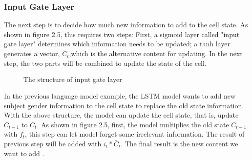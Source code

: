 \subsubsection{Input Gate Layer}
The next step is to decide how much new information to add to the cell state. As shown in figure 2.5, this requires two steps: First, a sigmoid layer called "input gate layer" determines which information needs to be updated; a tanh layer generates a vector, $\tilde{C_{t}}$,which is the alternative content for updating. In the next step, the two parts will be combined to update the state of the cell.
\begin{figure}[H]
\centering  %
\caption{The structure of input gate layer}
\label{The structure of input gate layer}
\end{figure}
In the previous language model example, the LSTM model wants to add new subject gender information to the cell state to replace the old state information. With the above structure, the model can update the cell state, that is, update $ C_{t-1} $ to $C_{t} $. As shown in figure 2.5, first, the model multiplies the old state $C_{t-1}$ with $f_{t}$, this step can let model forget some irrelevant information. The result of previous step will be added with  $i_{t} * \tilde{C_{t}}$. The final result is the new content we want to add \cite{LSTM-github}.
